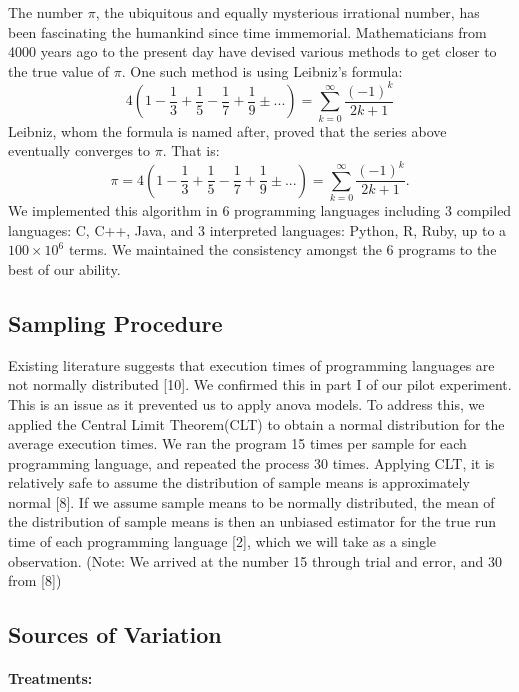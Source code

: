 \documentclass[12pt,halfline,a4paper,]{ouparticle}
\begin{document}
The number \(\pi\), the ubiquitous and equally mysterious irrational
number, has been fascinating the humankind since time immemorial.
Mathematicians from 4000 years ago to the present day have devised
various methods to get closer to the true value of \(\pi\). One such
method is using Leibniz's formula: \[
4 \left( 1 - \frac{1}{3} + \frac{1}{5} - \frac{1}{7} + \frac{1}{9} ±... \right) = \sum_{k=0}^{\infty}\frac{(-1)^k}{2k+1}
\] Leibniz, whom the formula is named after, proved that the series
above eventually converges to \(\pi\). That is: \[
\pi = 4 \left( 1 - \frac{1}{3} + \frac{1}{5} - \frac{1}{7} + \frac{1}{9} ±... \right) = \sum_{k=0}^{\infty}\frac{(-1)^k}{2k+1}.
\] We implemented this algorithm in 6 programming languages including 3
compiled languages: C, C++, Java, and 3 interpreted languages: Python,
R, Ruby, up to a \(100 \times 10^6\) terms. We maintained the
consistency amongst the 6 programs to the best of our ability.

\subsection{Sampling Procedure}\label{sampling-procedure}

Existing literature suggests that execution times of programming
languages are not normally distributed {[}10{]}. We confirmed this in
part I of our pilot experiment. This is an issue as it prevented us to
apply anova models. To address this, we applied the Central Limit
Theorem(CLT) to obtain a normal distribution for the average execution
times. We ran the program 15 times per sample for each programming
language, and repeated the process 30 times. Applying CLT, it is
relatively safe to assume the distribution of sample means is
approximately normal {[}8{]}. If we assume sample means to be normally
distributed, the mean of the distribution of sample means is then an
unbiased estimator for the true run time of each programming language
{[}2{]}, which we will take as a single observation. (Note: We arrived
at the number 15 through trial and error, and 30 from {[}8{]})

\subsection{Sources of Variation}\label{sources-of-variation}

\paragraph{Treatments:}\label{treatments}
\end{document}
